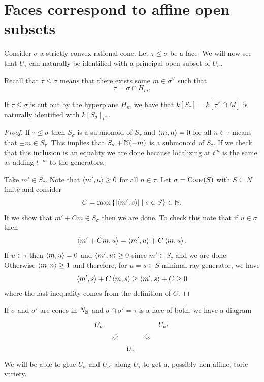 \section{Faces correspond to affine open subsets}
Consider $\sigma$ a strictly convex rational cone. Let $\tau\leq\sigma$ be a face. We will now see that $U_\tau$ can naturally be identified with a principal open subset of $U_\sigma$.


Recall that $\tau\leq \sigma$ means that there exists some $m\in \sigma^\vee$ such that
\[\tau=\sigma\cap H_m.\]
\begin{proposition}[]\label{PrFacesCorrespondToPrincipalOpenSubsetsOfAffineToricVariety}
If $\tau\leq \sigma$ is cut out by the hyperplane $H_m$ we have that $k[S_\tau]=k[\tau^\vee\cap M]$ is naturally identified with $k[S_\sigma]_{t^m}$.
\end{proposition}
\begin{proof}
If $\tau\leq \sigma$ then $S_\sigma$ is a submonoid of $S_\tau$ and $\left\langle {m,n}\right\rangle=0$ for all $n\in \tau$ means that $\pm m\in S_\tau$. This implies that $S_\sigma+\mathbb{N}(-m)$ is a submonoid of $S_\tau$. If we check that this inclusion is an equality we are done because localizing at $t^m$ is the same as adding $t^{-m}$ to the generators.

Take $m'\in S_\tau$. Note that $\left\langle {m',n}\right\rangle\geq 0$ for all $n\in \tau$. Let $\sigma=\operatorname{Cone}(S)$ with $S\subseteq N$ finite and consider
\[C=\max\left\{{\left|{\left\langle {m',s}\right\rangle}\right|\mid s\in S}\right\}\in \mathbb{N}.\]
If we show that $m'+Cm\in S_\sigma$ then we are done. To check this note that if $u\in \sigma$ then
\[\left\langle {m'+Cm,u}\right\rangle=\left\langle {m',u}\right\rangle+C\left\langle {m,u}\right\rangle.\]
If $u\in \tau$ then $\left\langle {m,u}\right\rangle=0$ and $\left\langle {m',u}\right\rangle\geq 0$ since $m'\in S_\tau$ and we are done. Otherwise $\left\langle {m,n}\right\rangle\geq 1$ and therefore, for $u=s\in S$ minimal ray generator, we have
\[\left\langle {m',s}\right\rangle+C\left\langle {m,s}\right\rangle\geq \left\langle {m',s}\right\rangle+C\geq 0\]
where the last inequality comes from the definition of $C$.
\end{proof}


\begin{remark}
If $\sigma$ and $\sigma'$ are cones in $N_{\mathbb{R}}$ and $\sigma\cap \sigma'=\tau$ is a face of both, we have a diagram
\[\begin{tikzcd}
	{U_\sigma} && {U_{\sigma'}} \\
	& {U_\tau}
	\arrow["\supseteq"{marking, allow upside down}, draw=none, from=1-1, to=2-2]
	\arrow["\subseteq"{marking, allow upside down}, draw=none, from=2-2, to=1-3]
\end{tikzcd}\]
We will be able to glue $U_\sigma$ and $U_{\sigma'}$ along $U_\tau$ to get a, possibly non-affine, toric variety.
\end{remark}








